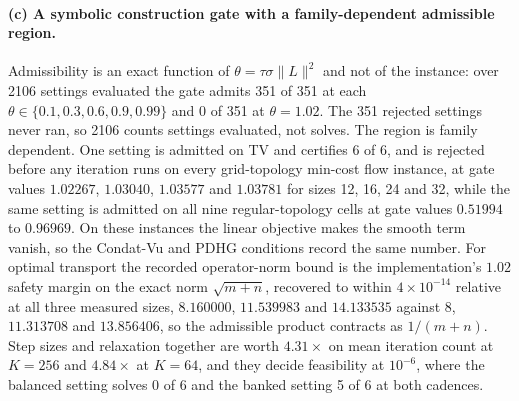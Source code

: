 \paragraph{(c) A symbolic construction gate with a family-dependent admissible
region.}
Admissibility is an exact function of $\theta = \tau\sigma\|L\|^2$ and not of
the instance: over 2106 settings evaluated the gate admits 351 of 351 at each
$\theta \in \{0.1, 0.3, 0.6, 0.9, 0.99\}$ and 0 of 351 at $\theta = 1.02$. The
351 rejected settings never ran, so 2106 counts settings evaluated, not solves.
The region is family dependent. One setting is admitted on TV and certifies
6 of 6, and is rejected before any iteration runs on every grid-topology
min-cost flow instance, at gate values $1.02267$, $1.03040$, $1.03577$ and
$1.03781$ for sizes 12, 16, 24 and 32, while the same setting is admitted on
all nine regular-topology cells at gate values $0.51994$ to $0.96969$. On these
instances the linear objective makes the smooth term vanish, so the Condat-Vu
and PDHG conditions record the same number.
For optimal transport the recorded operator-norm bound is the implementation's
$1.02$ safety margin on the exact norm $\sqrt{m+n}$, recovered to within
$4\times 10^{-14}$ relative at all three measured sizes, $8.160000$,
$11.539983$ and $14.133535$ against $8$, $11.313708$ and $13.856406$, so the
admissible product contracts as $1/(m{+}n)$.
Step sizes and relaxation together are worth $4.31\times$ on mean iteration
count at $K=256$ and $4.84\times$ at $K=64$, and they decide feasibility at
$10^{-6}$, where the balanced setting solves 0 of 6 and the banked setting
5 of 6 at both cadences.

